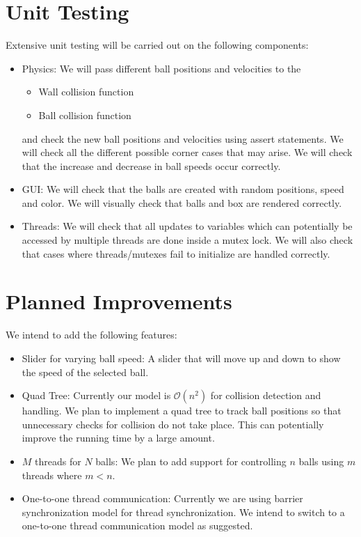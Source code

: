 \documentclass[]{article}
\begin{document}
\section{Unit Testing}
Extensive unit testing will be carried out on the following components:
\begin{itemize}
\item Physics: We will pass different ball positions and velocities to the \begin{itemize} \item Wall collision function \item Ball collision function \end{itemize} and check the new ball positions and velocities using assert statements. We will check all the different possible corner cases that may arise. We will check that the increase and decrease in ball speeds occur correctly.
\item GUI: We will check that the balls are created with random positions, speed and color. We will visually check that balls and box are rendered correctly.
\item Threads: We will check that all updates to variables which can potentially be accessed  by multiple threads are done inside a mutex lock. We will also check that cases where threads/mutexes fail to initialize are handled correctly.
\end{itemize}
\section{Planned Improvements}
We intend to add the following features:
\begin{itemize}
\item Slider for varying ball speed: A slider that will move up and down to show the speed of the selected ball.
\item Quad Tree: Currently our model is $\mathcal{O}(n^2)$ for collision detection and handling. We plan to implement a quad tree to track ball positions so that unnecessary checks for collision do not take place. This can potentially improve the running time by a large amount.
\item $M$ threads for $N$ balls: We plan to add support for controlling $n$ balls using $m$ threads where $m < n$.
\item One-to-one thread communication: Currently we are using barrier synchronization model for thread synchronization. We intend to switch to a one-to-one thread communication model as suggested.
\end{itemize}
\end{document}
